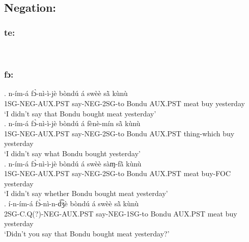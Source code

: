 \documentclass{assets/fieldnotes}
\begin{document}
\\

\subsection{Negation:}



\subsubsection{te:}

\\


\subsubsection{fɔ:}

\exg. n-ím-á fɔ̀-nì-ì-jè bòndú á swèè sã̀  kùnù\\
1SG-NEG-AUX.PST say-NEG-2SG-to Bondu AUX.PST meat buy yesterday\\
`I didn't say that Bondu bought meat yesterday' \\

\exg. n-ím-á fɔ̀-nì-ì-jè bòndú á fènè-mín sã̀  kùnù\\
1SG-NEG-AUX.PST say-NEG-2SG-to Bondu AUX.PST thing-which buy yesterday\\
`I didn't say what Bondu bought yesterday' \\

\exg. n-ím-á fɔ̀-nì-ì-jè bòndú á swèè sàɱ-fã̀  kùnù\\
1SG-NEG-AUX.PST say-NEG-2SG-to Bondu AUX.PST meat buy-FOC yesterday\\
`I didn't say whether Bondu bought meat yesterday' \\

\exg. í-n-ím-á fɔ̀-nì-n-d͡ʒè bòndú á swèè sã̀  kùnù\\
2SG-C.Q(?)-NEG-AUX.PST say-NEG-1SG-to Bondu AUX.PST meat buy yesterday\\
`Didn't you say that Bondu bought meat yesterday?' \\
\end{document}
